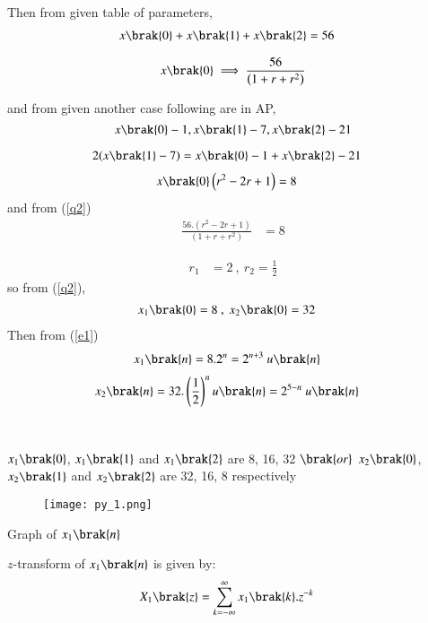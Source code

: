 \documentclass[beamer]{IEEEtran}
\theoremstyle{remark}
\begin{document}
Then from given table of parameters,
\begin{align}
x\brak{0}+x\brak{1}+x\brak{2}&=56
\end{align}

\begin{align}
\label{q2}
x\brak{0}\implies\frac{56}{\left(1+r+r^2\right)}
\end{align}

and from given another case following are in AP,
$$
x\brak{0}-1,x\brak{1}-7,x\brak{2}-21
$$

\begin{align}2(x\brak{1}-7)&=x\brak{0}-1+x\brak{2}-21\end{align}
\begin{align}x\brak{0}\left(r^2-2r+1\right)&=8\end{align}
and from (\ref{q2})
\begin{align}\frac{56.\left(r^2-2r+1\right)}{\left(1+r+r^2\right)}&=8\end{align}

\begin{align}
\label{q3}
r_1&=2\ ,\ r_2=\frac{1}{2}
\end{align}
so from (\ref{q2}),
\begin{align}x_1\brak{0}&=8\ ,\ x_2\brak{0}=32\end{align}
Then from (\ref{e1})
\begin{align}
    \label{a11}
    x_{1}\brak{n}&=8.2^{n}=2^{n+3}\ u\brak{n}
\end{align}
\begin{align}
    \label{a12}
    x_{2}\brak{n}=32.\left(\frac{1}{2}\right)^{n}u\brak{n}&=2^{5-n}\ u\brak{n}
\end{align}\\\\
$x_1\brak{0}$, $x_1\brak{1}$ and $x_1\brak{2}$ are 8, 16, 32 $\brak{or}$ $x_2\brak{0}$, $x_2\brak{1}$ and $x_2\brak{2}$ are 32, 16, 8 respectively
\begin{figure}[h]
    \centering
    \texttt{[image: py\_1.png]}
    \label{$2^{n+3}$}
\end{figure}

\begin{center}
    Graph of $x_1\brak{n}$
\end{center}
$z$-transform of $x_1\brak{n}$ is given by: 
\begin{align}
\label{a13}
    X_1\brak{z}&=\sum_{k=-\infty}^{\infty} x_1\brak{k}.z^{-k}
\end{align}
\end{document}
